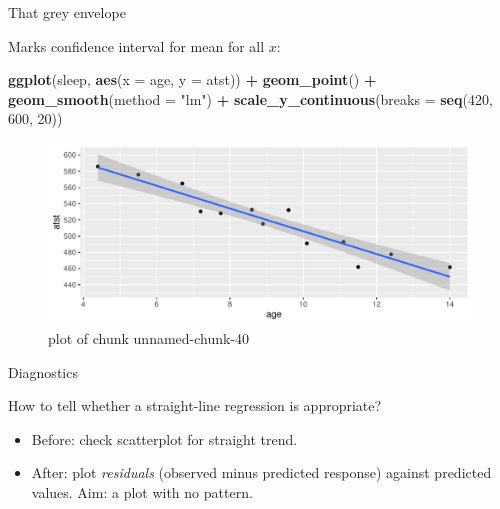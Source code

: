 \documentclass[ignorenonframetext,]{beamer}
\newenvironment{Shaded}{\begin{snugshade}}{\end{snugshade}}
\newcommand{\DataTypeTok}[1]{\textcolor[rgb]{0.13,0.29,0.53}{#1}}
\newcommand{\DecValTok}[1]{\textcolor[rgb]{0.00,0.00,0.81}{#1}}
\newcommand{\KeywordTok}[1]{\textcolor[rgb]{0.13,0.29,0.53}{\textbf{#1}}}
\newcommand{\NormalTok}[1]{#1}
\newcommand{\OperatorTok}[1]{\textcolor[rgb]{0.81,0.36,0.00}{\textbf{#1}}}
\newcommand{\StringTok}[1]{\textcolor[rgb]{0.31,0.60,0.02}{#1}}
\begin{document}
\begin{frame}[fragile]{That grey envelope}
\protect\hypertarget{that-grey-envelope}{}

Marks confidence interval for mean for all \(x\):

\begin{Shaded}
\begin{Highlighting}[]
\KeywordTok{ggplot}\NormalTok{(sleep, }\KeywordTok{aes}\NormalTok{(}\DataTypeTok{x =}\NormalTok{ age, }\DataTypeTok{y =}\NormalTok{ atst)) }\OperatorTok{+}\StringTok{ }\KeywordTok{geom_point}\NormalTok{() }\OperatorTok{+}
\StringTok{  }\KeywordTok{geom_smooth}\NormalTok{(}\DataTypeTok{method =} \StringTok{"lm"}\NormalTok{) }\OperatorTok{+}
\StringTok{  }\KeywordTok{scale_y_continuous}\NormalTok{(}\DataTypeTok{breaks =} \KeywordTok{seq}\NormalTok{(}\DecValTok{420}\NormalTok{, }\DecValTok{600}\NormalTok{, }\DecValTok{20}\NormalTok{))}
\end{Highlighting}
\end{Shaded}

\begin{figure}
\centering
\includegraphics{figure/unnamed-chunk-40-1.pdf}
\caption{plot of chunk unnamed-chunk-40}
\end{figure}

\end{frame}

\begin{frame}{Diagnostics}
\protect\hypertarget{diagnostics}{}

How to tell whether a straight-line regression is appropriate?

\vspace{3ex}

\begin{itemize}
\item
  Before: check scatterplot for straight trend.
\item
  After: plot \emph{residuals} (observed minus predicted response)
  against predicted values. Aim: a plot with no pattern.
\end{itemize}

\end{frame}
\end{document}

